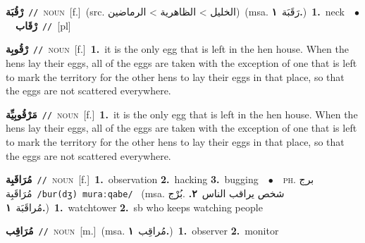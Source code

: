 \documentclass[10pt,a4paper,twoside]{article} %
\begin{document}
\begin{multicols}{2}
{\setlength\topsep{0pt}\textbf{\foreignlanguage{arabic}{رْقُبَة}}\ {\color{gray}\texttt{//}\color{black}}\ \textsc{noun}\ [f.]\ (src. \color{gray}\foreignlanguage{arabic}{الخليل > الظاهرية > الرماضين}\color{black})\ \color{gray}(msa. \foreignlanguage{arabic}{رَقَبَة}~\foreignlanguage{arabic}{\textbf{١.}})\color{black}\ \textbf{1.}~neck\ \ $\bullet$\ \ \setlength\topsep{0pt}\textbf{\foreignlanguage{arabic}{رْقَاب}}\ {\color{gray}\texttt{//}\color{black}}\ [pl]\ } \vspace{2mm}

{\setlength\topsep{0pt}\textbf{\foreignlanguage{arabic}{رْقُوبِة}}\ {\color{gray}\texttt{//}\color{black}}\ \textsc{noun}\ [f.]\ \textbf{1.}~it is the only egg that is left in the hen house. When the hens lay their eggs, all of the eggs are taken with the exception of one that is left to mark the territory for the other hens to lay their eggs in that place, so that the eggs are not scattered everywhere.\ } \vspace{2mm}

{\setlength\topsep{0pt}\textbf{\foreignlanguage{arabic}{مَرْقُوبِيِّة}}\ {\color{gray}\texttt{//}\color{black}}\ \textsc{noun}\ [f.]\ \textbf{1.}~it is the only egg that is left in the hen house. When the hens lay their eggs, all of the eggs are taken with the exception of one that is left to mark the territory for the other hens to lay their eggs in that place, so that the eggs are not scattered everywhere.\ } \vspace{2mm}

{\setlength\topsep{0pt}\textbf{\foreignlanguage{arabic}{مُرَاقَبِة}}\ {\color{gray}\texttt{//}\color{black}}\ \textsc{noun}\ [f.]\ \textbf{1.}~observation  \textbf{2.}~hacking  \textbf{3.}~bugging\ \ $\bullet$\ \ \textsc{ph.} \color{gray} \foreignlanguage{arabic}{برج مُرَاقَبِة}\color{black}\ {\color{gray}\texttt{/{\sffamily bur(dʒ) muraːqabe}/}\color{black}}\ \color{gray} (msa. \foreignlanguage{arabic}{شخص يراقب الناس}~\foreignlanguage{arabic}{\textbf{٢.}}  .\foreignlanguage{arabic}{بُرْج مُراقَبَة}~\foreignlanguage{arabic}{\textbf{١.}})\color{black}\ \textbf{1.}~watchtower  \textbf{2.}~sb who keeps watching people\ } \vspace{2mm}

{\setlength\topsep{0pt}\textbf{\foreignlanguage{arabic}{مُرَاقِب}}\ {\color{gray}\texttt{//}\color{black}}\ \textsc{noun}\ [m.]\ \color{gray}(msa. \foreignlanguage{arabic}{مُراقِب}~\foreignlanguage{arabic}{\textbf{١.}})\color{black}\ \textbf{1.}~observer  \textbf{2.}~monitor\ } \vspace{2mm}


\end{multicols}
\end{document}
